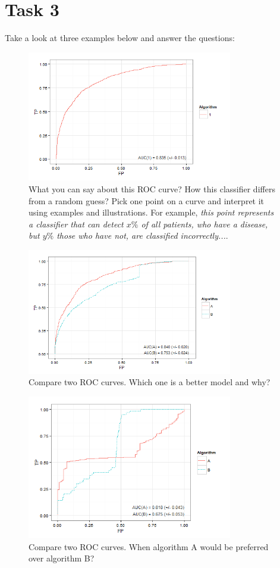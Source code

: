 \documentclass{article}
\begin{document}
\section*{Task 3}
Take a look at three examples below and answer the questions:
\begin{figure}[h!]
  \centering
      \includegraphics[width=0.8\textwidth]{plot1}
  \caption{What you can say about this ROC curve? How this classifier differs from a random guess? Pick one point on a curve and interpret it using examples and illustrations. For example, \emph{this point represents a classifier that can detect $x\%$ of all patients, who have a disease, but $y\%$ those who have not, are classified incorrectly...}.}
\end{figure}
\begin{figure}[h!]
  \centering
      \includegraphics[width=0.8\textwidth]{plot2}
  \caption{Compare two ROC curves. Which one is a better model and why?}
\end{figure}
\begin{figure}[H]
  \centering
      \includegraphics[width=0.8\textwidth]{plot3}
  \caption{Compare two ROC curves. When algorithm A would be preferred over algorithm B?}
\end{figure}
\end{document}
